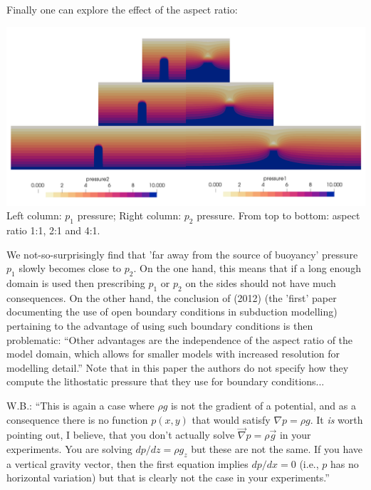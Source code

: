 Finally one can explore the effect of the aspect ratio:
\begin{center}
\includegraphics[width=14cm]{python_codes/fieldstone_119/results/exp5/all}\\
{\captionfont Left column: $p_1$ pressure; Right column: $p_2$ pressure. From 
top to bottom: aspect ratio 1:1, 2:1 and 4:1.}
\end{center}
We not-so-surprisingly find that 'far away from the source of buoyancy' 
pressure $p_1$ slowly becomes close to $p_2$. On the one hand, this means that 
if a long enough domain is used then prescribing $p_1$ or $p_2$ on the sides should not 
have much consequences. On the other hand, the conclusion of \textcite{chgv12} (2012) 
(the 'first' paper documenting the use of open boundary conditions in subduction modelling)
pertaining to the advantage of using such boundary conditions is then problematic: 
``Other advantages are the independence of the aspect ratio of the model domain, 
which allows for smaller models with increased resolution for modelling detail.''
Note that in this paper the authors do not specify how they compute the lithostatic pressure that 
they use for boundary conditions...

W.B.: ``This is again a case where $\rho g$ is not the gradient of a potential, 
and as a consequence there is no function $p(x,y)$ that would satisfy $\nabla p = \rho g$.
It {\it is} worth pointing out, I believe, that you don't actually solve
$\vec\nabla p = \rho \vec{g}$ in your experiments. You are solving $dp/dz = \rho g_z$
but these are not the same. If you have a vertical gravity vector, then the first equation 
implies $dp/dx=0$ (i.e., $p$ has no horizontal variation) but that is clearly not the case in your experiments.''
 








